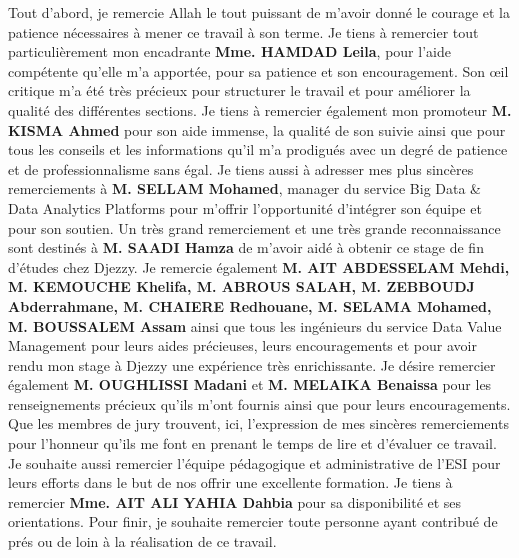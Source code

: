
Tout d'abord, je remercie Allah le tout puissant de m'avoir donné le courage et la patience nécessaires à mener ce travail à son terme.
Je tiens à remercier tout particulièrement mon encadrante \textbf{Mme. HAMDAD Leila}, pour l’aide compétente qu’elle m’a apportée, pour sa patience et son encouragement. Son œil critique m’a été très précieux pour structurer le travail et pour améliorer la qualité des différentes sections.
Je tiens à remercier également mon promoteur \textbf{M. KISMA Ahmed} pour son aide immense, la qualité de son suivie ainsi que pour tous les conseils et les informations qu'il m’a prodigués avec un degré de patience et de professionnalisme sans égal.
Je tiens aussi à adresser mes plus sincères remerciements à \textbf{M. SELLAM Mohamed}, manager du service Big Data \& Data Analytics Platforms pour m'offrir l'opportunité d'intégrer son équipe et pour son soutien.
Un très grand remerciement et une très grande reconnaissance sont destinés à \textbf{M. SAADI Hamza} de m'avoir aidé à obtenir ce stage de fin d'études chez Djezzy.
Je remercie également \textbf{M. AIT ABDESSELAM Mehdi, M. KEMOUCHE Khelifa, M. ABROUS SALAH, M. ZEBBOUDJ Abderrahmane, M. CHAIERE Redhouane, M. SELAMA Mohamed, M. BOUSSALEM Assam} ainsi que tous les ingénieurs du service Data Value Management pour leurs aides précieuses, leurs encouragements et pour avoir rendu mon stage à Djezzy une expérience très enrichissante.
Je désire remercier également \textbf{M. OUGHLISSI Madani} et \textbf{M. MELAIKA Benaissa} pour les renseignements précieux qu’ils m'ont fournis ainsi que pour leurs encouragements.
Que les membres de jury trouvent, ici, l'expression de mes sincères remerciements pour l'honneur qu'ils me font en prenant le temps de lire et d'évaluer ce travail.
Je souhaite aussi remercier l'équipe pédagogique et administrative de l'ESI pour leurs efforts dans le but de nos offrir une excellente formation.
Je tiens à remercier \textbf{Mme. AIT ALI YAHIA Dahbia} pour sa disponibilité et ses orientations.
Pour finir, je souhaite remercier toute personne ayant contribué de prés ou de loin à la réalisation de ce travail.

\clearpage